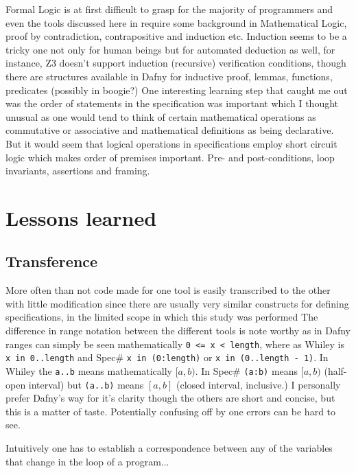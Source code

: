 \documentclass[10pt]{article} %
\begin{document}
Formal Logic is at first difficult to grasp for the majority of programmers and even the tools discussed here in require some background in Mathematical Logic, proof by contradiction, contrapositive and induction etc. Induction seems to be a tricky one not only for human beings but for automated deduction as well, for instance, Z3 doesn't support induction (recursive) verification conditions, though there are structures available in Dafny for inductive proof, lemmas, functions, predicates (possibly in boogie?) One interesting learning step that caught me out was the order of statements in the specification was important which I thought unusual as one would tend to think of certain  mathematical operations as commutative or associative and mathematical definitions as being declarative. But it would seem that logical operations in specifications employ short circuit logic which makes order of premises important. Pre- and post-conditions, loop invariants, assertions and framing.

\section{Lessons learned}

\subsection{Transference}
More often than not code made for one tool is easily transcribed to the other with little modification since there are usually very similar constructs for defining specifications, in the limited scope in which this study was performed The difference in range notation between the different tools is note worthy as in Dafny ranges can simply be seen mathematically \verb/0 <= x < length/, where as Whiley is \verb/x in 0..length/ and Spec\# \verb/x in (0:length)/ or \verb/x in (0..length - 1)/. In Whiley the \verb/a..b/ means mathematically $[a,b)$. In Spec\# \verb/(a:b)/ means  $[a,b)$ (half-open interval) but \verb/(a..b)/ means $[a,b]$ (closed interval, inclusive.) I personally prefer Dafny's way for it's clarity though the others are short and concise, but this is a matter of taste. Potentially confusing off by one errors can be hard to see.

Intuitively one has to establish a correspondence between any of the variables that change in the loop of a program...
\end{document}
